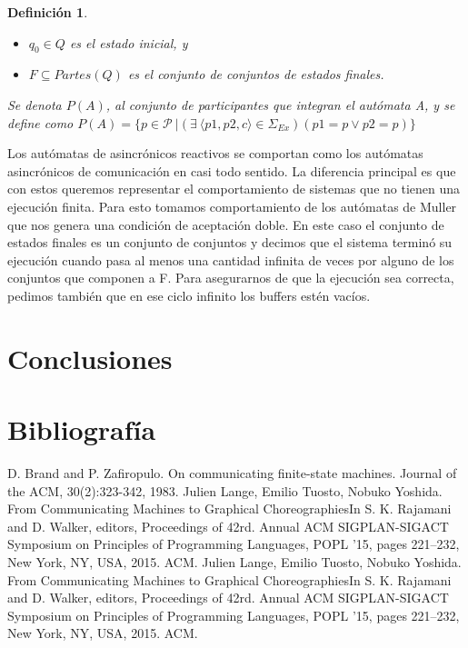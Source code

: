\documentclass[paper=a4, fontsize=11pt, spanish]{scrartcl} %
\numberwithin{equation}{section} %
\numberwithin{figure}{section} %
\numberwithin{table}{section} %
\newtheorem{definition}{Definición}
\begin{document}
\begin{definition}
\begin{itemize}
\item $q_0 \in Q$ es el estado inicial, y
\item $F \subseteq \mathit{Partes(Q)}$ es el conjunto de conjuntos de estados finales. 
\end{itemize}

Se denota $P(A)$, al conjunto de participantes que integran el autómata A, y se define como $P(A) = \{ p \in \mathcal{P} \ | (\exists\ \langle p1,p2,c\rangle \in \Sigma_\mathit{Ex})(p1=p \lor p2=p) \} $ 
\end{definition}

Los autómatas de asincrónicos reactivos se comportan como los autómatas asincrónicos de comunicación en casi todo sentido. La diferencia principal es que con estos queremos representar el comportamiento de sistemas que no tienen una ejecución finita. Para esto tomamos comportamiento de los autómatas de Muller que nos genera una condición de aceptación doble. En este caso el conjunto de estados finales es un conjunto de conjuntos y decimos que el sistema terminó su ejecución cuando pasa al menos una cantidad infinita de veces por alguno de los conjuntos que componen a F. Para asegurarnos de que la ejecución sea correcta, pedimos también que en ese ciclo infinito los buffers estén vacíos.


\section{Conclusiones}

\section{Bibliografía}
\begin{thebibliography}{}
D. Brand and P. Zafiropulo. On communicating finite-state machines. Journal of the ACM, 30(2):323-342, 1983.
Julien Lange, Emilio Tuosto, Nobuko Yoshida. From Communicating Machines to Graphical ChoreographiesIn S. K. Rajamani and D. Walker, editors, Proceedings of 42rd. Annual ACM SIGPLAN-SIGACT Symposium on Principles of Programming Languages, POPL ’15, pages 221–232, New York, NY, USA, 2015. ACM.
Julien Lange, Emilio Tuosto, Nobuko Yoshida. From Communicating Machines to Graphical ChoreographiesIn S. K. Rajamani and D. Walker, editors, Proceedings of 42rd. Annual ACM SIGPLAN-SIGACT Symposium on Principles of Programming Languages, POPL ’15, pages 221–232, New York, NY, USA, 2015. ACM.
\bibitem{}

\end{thebibliography}
\end{document}

